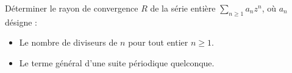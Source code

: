\documentclass[a4paper,twoside,french,11pt]{VcCours}
\newcommand{\Sum}[2]{\sum_{#1}^{#2}}
\begin{document}

\begin{Exercice}{} Déterminer le rayon de convergence $R$ de la série entière $\Sum{n\geq 1}{} a_n z^n$, où $a_n$ désigne : 
\begin{itemize}
\item Le nombre de diviseurs de $n$ pour tout entier $n\geq 1$.
\item Le terme général d'une suite périodique quelconque. 
\end{itemize}
\end{Exercice}
\end{document}
